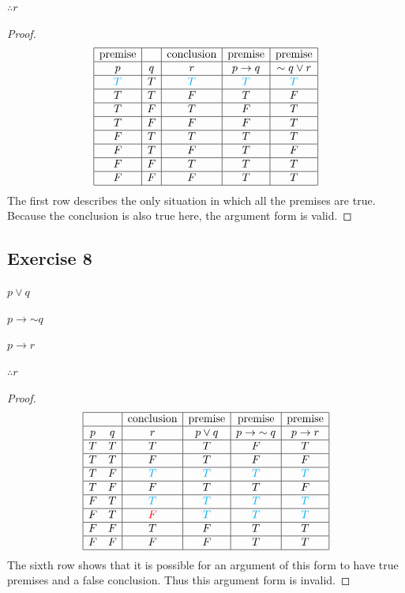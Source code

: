 \documentclass[14pt]{extarticle}
\begin{document}
$\therefore r$

\begin{proof}
$$
\begin{array}{|c|c|c|c|c|}
\hline
\text{premise} & & \text{conclusion} & \text{premise} & \text{premise} \\
\hline
p & q & r & p \to q & {\sim q} \vee r \\
\hline
\color{cyan} T & T & \color{cyan} T & \color{cyan} T & \color{cyan} T \\
\hline
T & T & F & T & F \\
\hline
T & F & T & F & T \\
\hline
T & F & F & F & T \\
\hline
F & T & T & T & T \\
\hline
F & T & F & T & F \\
\hline
F & F & T & T & T \\
\hline
F & F & F & T & T \\
\hline
\end{array}
$$
The first row describes the only situation in which all the premises are true.
Because the conclusion is also true here, the argument form is valid.
\end{proof}

\subsection{Exercise 8}
$p \vee q$

$p \to {\sim q}$

$p \to r$

$\therefore r$

\begin{proof}
$$
\begin{array}{|cc|c|c|c|c|}
\hline
 & & \text{conclusion} & \text{premise} & \text{premise} & \text{premise} \\
\hline
p & q & r & p \vee q & p \to {\sim q} & p \to r \\
\hline
T & T & T & T & F & T \\
\hline
T & T & F & T & F & F \\
\hline
T & F & \color{cyan} T & \color{cyan} T & \color{cyan} T & \color{cyan} T \\
\hline
T & F & F & T & T & F \\
\hline
F & T & \color{cyan} T & \color{cyan} T & \color{cyan} T & \color{cyan} T \\
\hline
F & T & \color{red} F & \color{cyan} T & \color{cyan} T & \color{cyan} T \\
\hline
F & F & T & F & T & T \\
\hline
F & F & F & F & T & T \\
\hline
\end{array}
$$
The sixth row shows that it is possible for an argument of this form to have
true premises and a false conclusion. Thus this argument form is invalid.
\end{proof}
\end{document}
